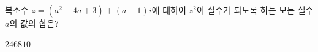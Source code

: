 복소수 $z=(a^2-4a+3)+(a-1)i$에 대하여 $z^2$이 실수가 되도록 하는 모든 실수 $a$의 값의 합은?
\begin{choices32}{$2$}{$4$}{$6$}{$8$}{$10$}\end{choices32}

